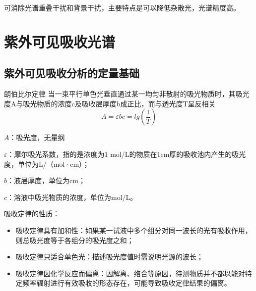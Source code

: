 \begin{itemize}
\begin{itemize}
        可消除光谱重叠干扰和背景干扰，主要特点是可以降低杂散光，光谱精度高。
    \end{itemize}
\end{itemize}
\section{紫外可见吸收光谱}
\subsection{紫外可见吸收分析的定量基础}
\begin{theorem*}{朗伯比尔定律}
    当一束平行单色光垂直通过某一均匀非散射的吸光物质时，其吸光度A与吸光物质的浓度c及吸收层厚度b成正比，而与透光度T呈反相关
    \begin{equation*}
        A=\varepsilon bc =lg(\frac{1}{T})
    \end{equation*}
\end{theorem*}
\begin{note}
$A$：吸光度，无量纲

$\varepsilon$：摩尔吸光系数，指的是浓度为1 mol/L的物质在1cm厚的吸收池内产生的吸光度，单位为L/（mol·cm）；

$b$：液层厚度，单位为cm；

$c$：溶液中吸光物质的浓度，单位为mol/L。
\end{note}

吸收定律的性质：
\begin{itemize}
    \item 吸收定律具有加和性：如果某一试液中多个组分对同一波长的光有吸收作用，则总吸光度等于各组分的吸光度之和；
    \item 吸收定律只适合单色光：描述吸光度值时需说明光源的波长；
    \item 吸收定律因化学反应而偏离：因解离、络合等原因，待测物质并不都以能对特定频率辐射进行有效吸收的形态存在，可能导致吸收定律结果的偏离。
\end{itemize}

